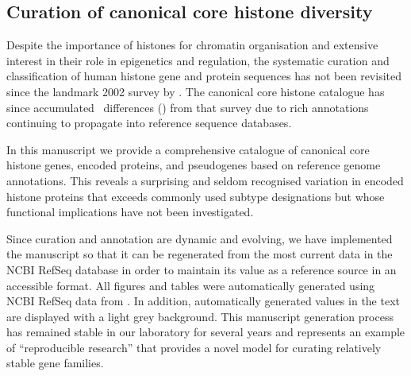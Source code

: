   \subsection{Curation of canonical core histone diversity}

    Despite the importance of histones for chromatin organisation and extensive interest
    in their role in epigenetics and regulation, the systematic
    curation and classification of human histone
    gene and protein sequences has not been revisited
    since the landmark 2002 survey by \citet{Marzluff02}.
    The canonical core histone catalogue has since accumulated
    \TotalChangesSinceReference{}~differences ()
    from that survey due to rich annotations continuing to propagate
    into reference sequence databases.

    In this manuscript we provide a comprehensive catalogue
    of canonical core histone genes, encoded proteins, and pseudogenes
    based on reference genome annotations.
    This reveals a surprising and seldom recognised variation in encoded histone proteins
    that exceeds commonly used subtype designations
    but whose functional implications have not been investigated.

    Since curation and annotation are dynamic and evolving, we have
    implemented the manuscript so that it can be regenerated from the
    most current data in the NCBI RefSeq database in order to maintain
    its value as a reference source in an accessible format.  All
    figures and tables were automatically generated using NCBI RefSeq
    data from \printdate{\SequencesDate{}}.  In addition,
    automatically generated values in the text are displayed with a
    light grey background.  This manuscript generation process has
    remained stable in our laboratory for several years and represents
    an example of ``reproducible research'' \citep{Claerbout2000} that
    provides a novel model for curating relatively stable gene
    families.
